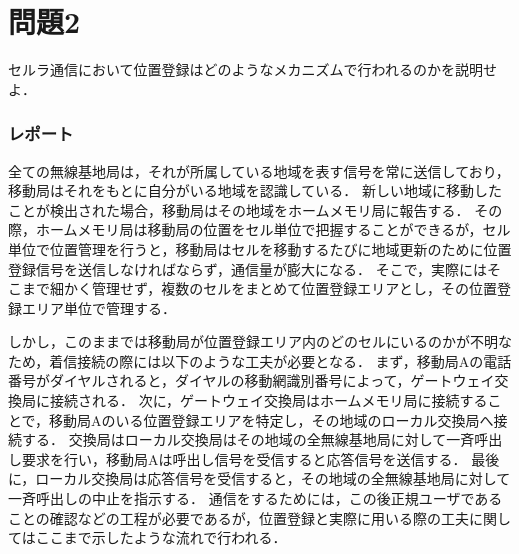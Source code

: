 \section*{問題2}
セルラ通信において位置登録はどのようなメカニズムで行われるのかを説明せよ．

\subsubsection*{レポート}
全ての無線基地局は，それが所属している地域を表す信号を常に送信しており，移動局はそれをもとに自分がいる地域を認識している．
新しい地域に移動したことが検出された場合，移動局はその地域をホームメモリ局に報告する．
その際，ホームメモリ局は移動局の位置をセル単位で把握することができるが，セル単位で位置管理を行うと，移動局はセルを移動するたびに地域更新のために位置登録信号を送信しなければならず，通信量が膨大になる．
そこで，実際にはそこまで細かく管理せず，複数のセルをまとめて位置登録エリアとし，その位置登録エリア単位で管理する．\par
しかし，このままでは移動局が位置登録エリア内のどのセルにいるのかが不明なため，着信接続の際には以下のような工夫が必要となる．
まず，移動局Aの電話番号がダイヤルされると，ダイヤルの移動網識別番号によって，ゲートウェイ交換局に接続される．
次に，ゲートウェイ交換局はホームメモリ局に接続することで，移動局Aのいる位置登録エリアを特定し，その地域のローカル交換局へ接続する．
交換局はローカル交換局はその地域の全無線基地局に対して一斉呼出し要求を行い，移動局Aは呼出し信号を受信すると応答信号を送信する．
最後に，ローカル交換局は応答信号を受信すると，その地域の全無線基地局に対して一斉呼出しの中止を指示する．
通信をするためには，この後正規ユーザであることの確認などの工程が必要であるが，位置登録と実際に用いる際の工夫に関してはここまで示したような流れで行われる．

